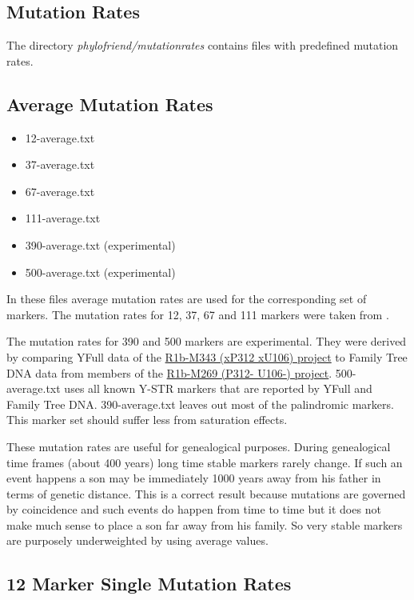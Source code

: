 \subsection{Mutation Rates}

The directory \emph{phylofriend/mutationrates} contains
files with predefined mutation rates.


\subsection*{Average Mutation Rates}

\begin{itemize}
\item 12-average.txt
\item 37-average.txt
\item 67-average.txt
\item 111-average.txt
\item 390-average.txt (experimental)
\item 500-average.txt (experimental)
\end{itemize}

In these files average mutation rates are used for the
corresponding set of markers. The mutation rates for 12,
37, 67 and 111 markers were taken from \cite{Kly12}.

The mutation rates for 390 and 500 markers are experimental.
They were derived by comparing YFull data of the
\href{http://yfull.com/groups/list/}{R1b-M343 (xP312 xU106) project}
to Family Tree DNA data from members of the
\href{https://www.familytreedna.com/groups/ht-3-5new/about/background}{R1b-M269 (P312- U106-) project}.
500-average.txt uses all known Y-STR markers that are
reported by YFull and Family Tree DNA. 390-average.txt leaves
out most of the palindromic markers. This marker set should
suffer less from saturation effects.

These mutation rates are useful for genealogical purposes.
During genealogical time frames (about 400 years) long time
stable markers rarely change. If such an event happens a
son may be immediately 1000 years away from his father in
terms of genetic distance. This is a correct result because
mutations are governed by coincidence and such events do
happen from time to time but it does not make much sense
to place a son far away from his family. So very stable
markers are purposely underweighted by using average
values.


\subsection*{12 Marker Single Mutation Rates}

